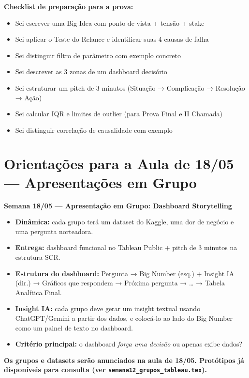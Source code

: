 \begin{NoteBox}
\textbf{Checklist de preparação para a prova:}
\begin{itemize}
  \item[$\square$] Sei escrever uma Big Idea com ponto de vista + tensão + stake
  \item[$\square$] Sei aplicar o Teste do Relance e identificar suas 4 causas de falha
  \item[$\square$] Sei distinguir filtro de parâmetro com exemplo concreto
  \item[$\square$] Sei descrever as 3 zonas de um dashboard decisório
  \item[$\square$] Sei estruturar um pitch de 3 minutos (Situação → Complicação → Resolução → Ação)
  \item[$\square$] Sei calcular IQR e limites de outlier (para Prova Final e II Chamada)
  \item[$\square$] Sei distinguir correlação de causalidade com exemplo
\end{itemize}
\end{NoteBox}

\section{Orientações para a Aula de 18/05 — Apresentações em Grupo}

\begin{BoardBox}
\textbf{Semana 18/05 — Apresentação em Grupo: Dashboard Storytelling}

\begin{itemize}
  \item \textbf{Dinâmica:} cada grupo terá um dataset do Kaggle, uma dor de negócio e
  uma pergunta norteadora.
  \item \textbf{Entrega:} dashboard funcional no Tableau Public + pitch de 3 minutos
  na estrutura SCR.
  \item \textbf{Estrutura do dashboard:} Pergunta → Big Number (esq.) + Insight IA (dir.)
  → Gráficos que respondem → Próxima pergunta → … → Tabela Analítica Final.
  \item \textbf{Insight IA:} cada grupo deve gerar um insight textual usando ChatGPT/Gemini
  a partir dos dados, e colocá-lo ao lado do Big Number como um painel de texto no
  dashboard.
  \item \textbf{Critério principal:} o dashboard \emph{força uma decisão} ou apenas
  exibe dados?
\end{itemize}

\textbf{Os grupos e datasets serão anunciados na aula de 18/05. Protótipos já
disponíveis para consulta (ver \texttt{semana12\_grupos\_tableau.tex}).}
\end{BoardBox}
